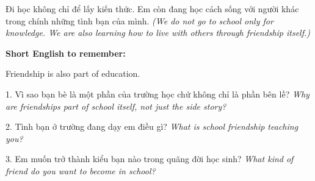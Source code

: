 \begin{baihoc}
Đi học không chỉ để lấy kiến thức. Em còn đang học cách sống với người khác trong chính những tình bạn của mình.
\textit{(We do not go to school only for knowledge. We are also learning how to live with others through friendship itself.)}
\end{baihoc}

\begin{ghinhoanh}
\textbf{Short English to remember:}

Friendship is also part of education.

\end{ghinhoanh}

\begin{tuhocnhanh}
1. Vì sao bạn bè là một phần của trường học chứ không chỉ là phần bên lề? \textit{Why are friendships part of school itself, not just the side story?}

2. Tình bạn ở trường đang dạy em điều gì? \textit{What is school friendship teaching you?}

3. Em muốn trở thành kiểu bạn nào trong quãng đời học sinh? \textit{What kind of friend do you want to become in school?}
\end{tuhocnhanh}
\ngancach
